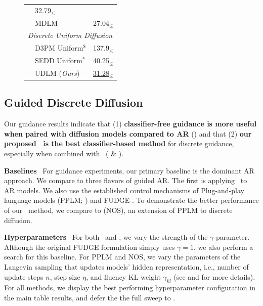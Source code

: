 \documentclass{article} %
\begin{document}
\begin{figure}
\begin{minipage}[t]{0.46\linewidth}
\begin{tabular}{llc}
    & 32.79$_\leq$ \\
    & MDLM
    \scriptsize{\citep{sahoo2024simple}}
    & 27.04$_\leq$ \\
    \midrule
    \multicolumn{3}{l}{\textit{Discrete Uniform Diffusion}} \\
    & D3PM Uniform$^\text{\$}$ 
    \scriptsize{\citep{austin2021structured}}
    & 137.9$_\leq$ \\
    & SEDD Uniform$^\text{*}$ 
    \scriptsize{\citep{lou2023discrete}}
    & 40.25$_\leq$ \\
    & UDLM (\textit{Ours}) & \underline{31.28}$_\leq$ \\
    \bottomrule
\end{tabular}
\end{minipage}
\end{figure}

\subsection{Guided Discrete Diffusion}\label{subsec:results_guidance}
Our guidance results indicate that (1) \textbf{classifier-free guidance is more useful when paired with diffusion models compared to AR} () and that (2) \textbf{our proposed \cbg~is the best classifier-based method} for discrete guidance, especially when combined with \method~( \& ).

\textbf{Baselines}~
For guidance experiments, our primary baseline is the dominant AR approach.
We compare to three flavors of guided AR.
The first is applying \cfg~to AR models.
We also use the established control mechanisms of Plug-and-play language models (PPLM; \citet{dathathri2019plug}) and FUDGE \citep{yang2021fudge}.
To demonstrate the better performance of our \cbg~method, we compare to \citet{gruver2024protein} (NOS), an extension of PPLM to discrete diffusion.

\textbf{Hyperparameters}~
For both \cfg~and \cbg, we vary the strength of the $\gamma$ parameter.
Although the original FUDGE formulation simply uses $\gamma=1$, we also perform a search for this baseline.
For PPLM and NOS, we vary the parameters of the Langevin sampling that updates models' hidden representation, i.e., number of update steps $n$, step size $\eta$, and fluency KL weight $\gamma_{kl}$ (see \cite{dathathri2019plug} and \cite{gruver2024protein} for more details).
For all methods, we display the best performing hyperparameter configuration in the main table results, and defer the the full sweep to .
\end{document}
